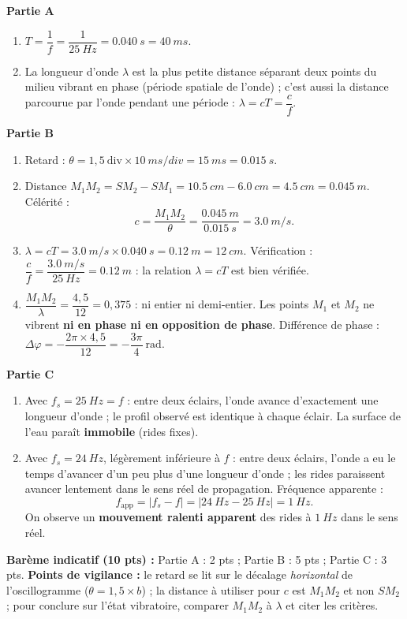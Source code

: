 \documentclass[11pt]{article}
\begin{document}
\begin{corrige}
\textbf{Partie A}
\begin{enumerate}
\item $T = \dfrac{1}{f} = \dfrac{1}{\SI{25}{Hz}} = \SI{0,040}{s} = \SI{40}{ms}$.
\item La longueur d'onde $\lambda$ est la plus petite distance séparant deux points du milieu vibrant en phase (période spatiale de l'onde) ; c'est aussi la distance parcourue par l'onde pendant une période : $\lambda = cT = \dfrac{c}{f}$.
\end{enumerate}
\textbf{Partie B}
\begin{enumerate}
\item Retard : $\theta = 1,5\ \text{div} \times \SI{10}{ms/div} = \SI{15}{ms} = \SI{0,015}{s}$.
\item Distance $M_1M_2 = SM_2 - SM_1 = \SI{10,5}{cm} - \SI{6,0}{cm} = \SI{4,5}{cm} = \SI{0,045}{m}$. Célérité :
\[ c = \frac{M_1M_2}{\theta} = \frac{\SI{0,045}{m}}{\SI{0,015}{s}} = \SI{3,0}{m/s}. \]
\item $\lambda = cT = \SI{3,0}{m/s} \times \SI{0,040}{s} = \SI{0,12}{m} = \SI{12}{cm}$. Vérification : $\dfrac{c}{f} = \dfrac{\SI{3,0}{m/s}}{\SI{25}{Hz}} = \SI{0,12}{m}$ : la relation $\lambda = cT$ est bien vérifiée.
\item $\dfrac{M_1M_2}{\lambda} = \dfrac{4,5}{12} = 0,375$ : ni entier ni demi-entier. Les points $M_1$ et $M_2$ ne vibrent \textbf{ni en phase ni en opposition de phase}. Différence de phase : $\Delta\varphi = -\dfrac{2\pi \times 4,5}{12} = -\dfrac{3\pi}{4}\ \text{rad}$.
\end{enumerate}
\textbf{Partie C}
\begin{enumerate}
\item Avec $f_s = \SI{25}{Hz} = f$ : entre deux éclairs, l'onde avance d'exactement une longueur d'onde ; le profil observé est identique à chaque éclair. La surface de l'eau paraît \textbf{immobile} (rides fixes).
\item Avec $f_s = \SI{24}{Hz}$, légèrement inférieure à $f$ : entre deux éclairs, l'onde a eu le temps d'avancer d'un peu plus d'une longueur d'onde ; les rides paraissent avancer lentement dans le sens réel de propagation. Fréquence apparente :
\[ f_{\text{app}} = |f_s - f| = |\SI{24}{Hz} - \SI{25}{Hz}| = \SI{1}{Hz}. \]
On observe un \textbf{mouvement ralenti apparent} des rides à $\SI{1}{Hz}$ dans le sens réel.
\end{enumerate}
\textbf{Barème indicatif (10 pts) :} Partie A : 2 pts ; Partie B : 5 pts ; Partie C : 3 pts.
\textbf{Points de vigilance :} le retard se lit sur le décalage \emph{horizontal} de l'oscillogramme ($\theta = 1,5 \times b$) ; la distance à utiliser pour $c$ est $M_1M_2$ et non $SM_2$ ; pour conclure sur l'état vibratoire, comparer $M_1M_2$ à $\lambda$ et citer les critères.
\end{corrige}
\end{document}
